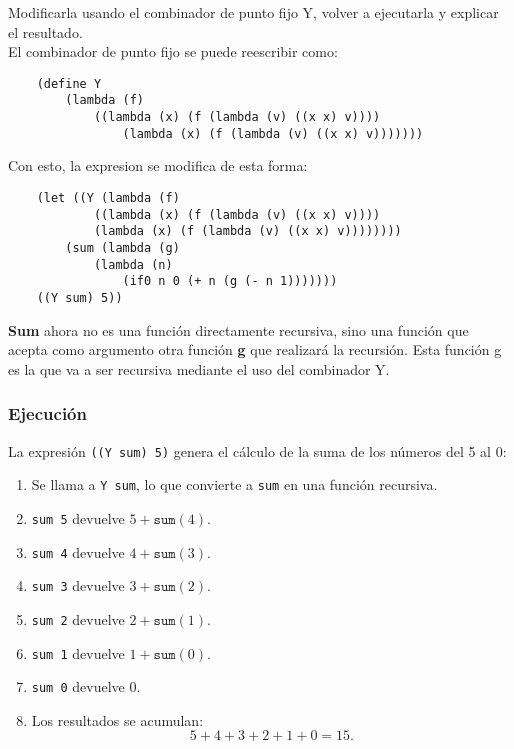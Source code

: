 Modificarla usando el combinador de punto fijo Y, volver a ejecutarla y explicar el resultado.\\
El combinador de punto fijo se puede reescribir como:
\begin{verbatim}
	(define Y 
		(lambda (f) 
			((lambda (x) (f (lambda (v) ((x x) v)))) 
				(lambda (x) (f (lambda (v) ((x x) v)))))))
\end{verbatim}
Con esto, la expresion se modifica de esta forma:
\begin{verbatim}
	(let ((Y (lambda (f)
			((lambda (x) (f (lambda (v) ((x x) v))))
			(lambda (x) (f (lambda (v) ((x x) v))))))))
		(sum (lambda (g)
			(lambda (n)
				(if0 n 0 (+ n (g (- n 1)))))))
	((Y sum) 5))
\end{verbatim}

\textbf{Sum} ahora no es una función directamente recursiva, sino una función que acepta como argumento otra función \textbf{g} que realizará la recursión.
Esta función g es la que va a ser recursiva mediante el uso del combinador Y.

\subsubsection*{Ejecución}
La expresión \texttt{((Y sum) 5)} genera el cálculo de la suma de los números del 5 al 0:
\begin{enumerate}
	\item Se llama a \texttt{Y sum}, lo que convierte a \texttt{sum} en una función recursiva.
	\item \texttt{sum 5} devuelve \(5 + \texttt{sum}(4)\).
	\item \texttt{sum 4} devuelve \(4 + \texttt{sum}(3)\).
	\item \texttt{sum 3} devuelve \(3 + \texttt{sum}(2)\).
	\item \texttt{sum 2} devuelve \(2 + \texttt{sum}(1)\).
	\item \texttt{sum 1} devuelve \(1 + \texttt{sum}(0)\).
	\item \texttt{sum 0} devuelve 0.
	\item Los resultados se acumulan: 
	\[
	5 + 4 + 3 + 2 + 1 + 0 = 15.
	\]
\end{enumerate}